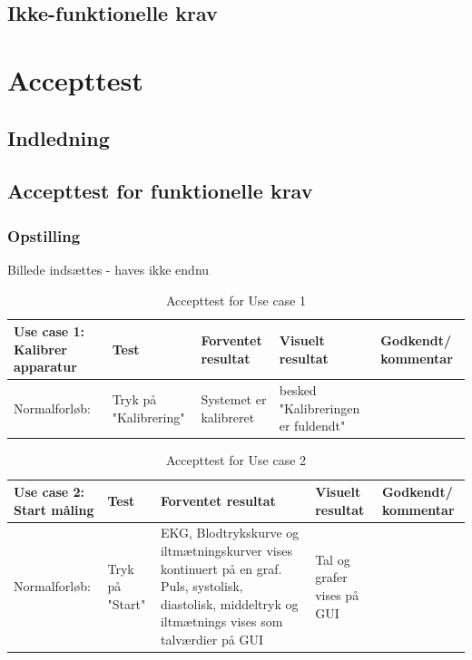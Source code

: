 \section{Ikke-funktionelle krav}

\chapter{Accepttest}
\section{Indledning}
\section{Accepttest for funktionelle krav}

\subsection{Opstilling}
Billede indsættes - haves ikke endnu

\begin{table}[h!]
\caption{Accepttest for Use case 1}\label{tab:tabel8}
\begin{tabular}{|>{\raggedright\arraybackslash}p{2.5cm}| >{\raggedright\arraybackslash}p{2.9cm} | >{\raggedright\arraybackslash}p{2.9cm} | >{\raggedright\arraybackslash}p{2.9cm} | >{\raggedright\arraybackslash}p{2.8cm} |}
   \hline
   \textbf{Use case 1: Kalibrer apparatur} &\textbf{Test}& \textbf{Forventet resultat} & \textbf{Visuelt resultat} & \textbf{Godkendt/ kommentar}\\ \hline
   Normalforløb:& Tryk på "Kalibrering" &Systemet er kalibreret & besked "Kalibreringen er fuldendt" &\\\hline
\end{tabular}
\end{table}



\begin{table}[h!]
\caption{Accepttest for Use case 2}\label{tab:tabel8}
\begin{tabular}{|>{\raggedright\arraybackslash}p{2.5cm}| >{\raggedright\arraybackslash}p{2.9cm} | >{\raggedright\arraybackslash}p{2.9cm} | >{\raggedright\arraybackslash}p{2.9cm} | >{\raggedright\arraybackslash}p{2.8cm} |}
   \hline
   \textbf{Use case 2: Start måling } &\textbf{Test}& \textbf{Forventet resultat} & \textbf{Visuelt resultat} & \textbf{Godkendt/ kommentar}\\ \hline
   Normalforløb:& Tryk på "Start" & EKG, Blodtrykskurve og iltmætningskurver vises kontinuert på en graf. \newline Puls, systolisk, diastolisk, middeltryk og iltmætnings vises som talværdier på GUI & Tal og grafer vises på GUI &\\\hline
\end{tabular}
\end{table}

